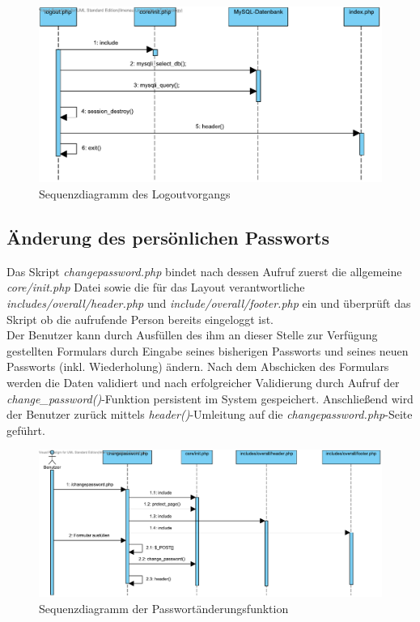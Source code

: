 \documentclass[fontsize = 12pt, paper = a4]{scrreprt}
\begin{document}
\begin{figure}[h]
\centering
\includegraphics[scale = 0.7]{logout}
\caption[Sequenzdiagramm des Logoutvorgangs]{Sequenzdiagramm des Logoutvorgangs}
\label{logout}
\end{figure}

\newpage
\subsection{Änderung des persönlichen Passworts}
Das Skript \textit{changepassword.php} bindet nach dessen Aufruf zuerst die allgemeine \textit{core/init.php} Datei sowie die für das Layout verantwortliche \textit{includes/overall/header.php} und \textit{include/overall/footer.php} ein und überprüft das Skript ob die aufrufende Person bereits eingeloggt ist.\\
Der Benutzer kann durch Ausfüllen des ihm an dieser Stelle zur Verfügung gestellten Formulars durch Eingabe seines bisherigen Passworts und seines neuen Passworts (inkl. Wiederholung) ändern. Nach dem Abschicken des Formulars werden die Daten validiert und nach erfolgreicher Validierung durch Aufruf der \textit{change\_password()}-Funktion persistent im System gespeichert. Anschließend wird der Benutzer zurück mittels \textit{header()}-Umleitung auf die \textit{changepassword.php}-Seite geführt.

\begin{figure}[h]
\centering
\includegraphics[scale = 0.6]{passwort}
\caption[Sequenzdiagramm der Passwort\"{a}nderungsfunktion]{Sequenzdiagramm der Passwort\"{a}nderungsfunktion}
\label{passwort}
\end{figure}
\end{document}
